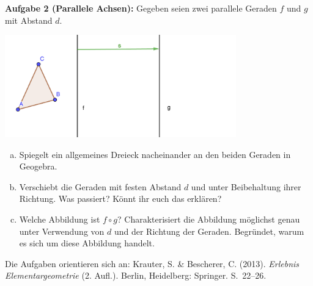 \documentclass{../cssheet}
\begin{document}
\textbf{Aufgabe 2 (Parallele Achsen):}  Gegeben seien zwei parallele Geraden $f$ und $g$ mit Abstand $d$.
\begin{center}
\includegraphics[width=10cm]{zwei-parallele-geraden.png}
\end{center}
\begin{enumerate}[a)]
\item Spiegelt ein allgemeines Dreieck nacheinander an den beiden Geraden in Geogebra. 
\item Verschiebt die Geraden mit festen Abstand $d$ und unter Beibehaltung ihrer Richtung. Was passiert? Könnt ihr euch das erklären?
\item Welche Abbildung ist $f\circ g$? Charakterisiert die Abbildung möglichst genau unter Verwendung von $d$ und der Richtung der Geraden. Begründet, warum es sich um diese Abbildung handelt.
\end{enumerate}

Die Aufgaben orientieren sich an: Krauter, S. \& Bescherer, C. (2013). \emph{Erlebnis Elementargeometrie} (2. Aufl.). Berlin, Heidelberg: Springer. S.~22--26.

\vspace*{10mm}

\printlicense

\printsocials
\end{document}
